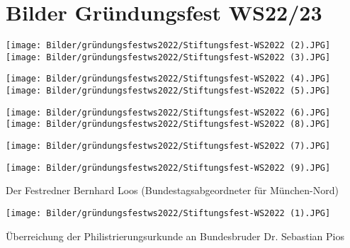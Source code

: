 \section{Bilder Gründungsfest WS22/23}




	
	\begin{figurehere}
		
			\texttt{[image: Bilder/gründungsfestws2022/Stiftungsfest-WS2022 (2).JPG]}
			\texttt{[image: Bilder/gründungsfestws2022/Stiftungsfest-WS2022 (3).JPG]}
		
		   \texttt{[image: Bilder/gründungsfestws2022/Stiftungsfest-WS2022 (4).JPG]}
			\texttt{[image: Bilder/gründungsfestws2022/Stiftungsfest-WS2022 (5).JPG]}
			
			\texttt{[image: Bilder/gründungsfestws2022/Stiftungsfest-WS2022 (6).JPG]}
			\texttt{[image: Bilder/gründungsfestws2022/Stiftungsfest-WS2022 (8).JPG]}
			
			\texttt{[image: Bilder/gründungsfestws2022/Stiftungsfest-WS2022 (7).JPG]}
		    
	\end{figurehere}
	
	\newpage

\begin{center}
\begin{figurehere}
  \texttt{[image: Bilder/gründungsfestws2022/Stiftungsfest-WS2022 (9).JPG]}
  \caption{ Der Festredner Bernhard Loos (Bundestagsabgeordneter für München-Nord)  }
\end{figurehere}
\end{center}	
	

\begin{center}
\begin{figurehere}
  \texttt{[image: Bilder/gründungsfestws2022/Stiftungsfest-WS2022 (1).JPG]}
  \caption{Überreichung der Philistrierungsurkunde an Bundesbruder Dr. Sebastian Pios}
\end{figurehere}
\end{center}

